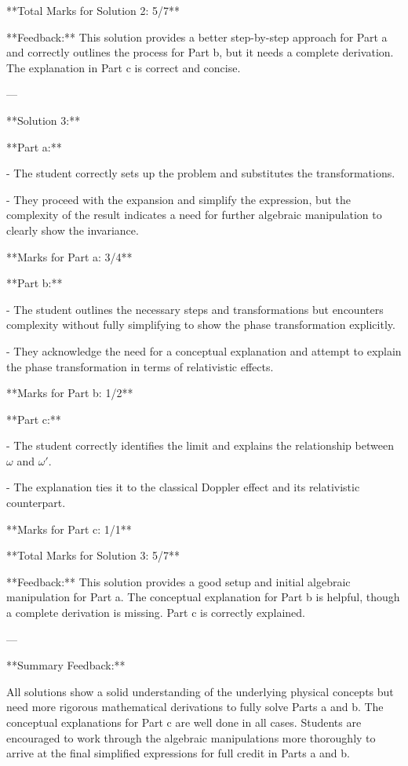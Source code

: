 \documentclass[a4paper,11pt]{article}
\begin{document}
**Total Marks for Solution 2: 5/7**

**Feedback:** This solution provides a better step-by-step approach for Part a and correctly outlines the process for Part b, but it needs a complete derivation. The explanation in Part c is correct and concise.

---

**Solution 3:**

**Part a:**

- The student correctly sets up the problem and substitutes the transformations.

- They proceed with the expansion and simplify the expression, but the complexity of the result indicates a need for further algebraic manipulation to clearly show the invariance.

**Marks for Part a: 3/4**

**Part b:**

- The student outlines the necessary steps and transformations but encounters complexity without fully simplifying to show the phase transformation explicitly.

- They acknowledge the need for a conceptual explanation and attempt to explain the phase transformation in terms of relativistic effects.

**Marks for Part b: 1/2**

**Part c:**

- The student correctly identifies the limit and explains the relationship between \(\omega\) and \(\omega'\).

- The explanation ties it to the classical Doppler effect and its relativistic counterpart.

**Marks for Part c: 1/1**

**Total Marks for Solution 3: 5/7**

**Feedback:** This solution provides a good setup and initial algebraic manipulation for Part a. The conceptual explanation for Part b is helpful, though a complete derivation is missing. Part c is correctly explained.

---

**Summary Feedback:**

All solutions show a solid understanding of the underlying physical concepts but need more rigorous mathematical derivations to fully solve Parts a and b. The conceptual explanations for Part c are well done in all cases. Students are encouraged to work through the algebraic manipulations more thoroughly to arrive at the final simplified expressions for full credit in Parts a and b.
\end{document}
